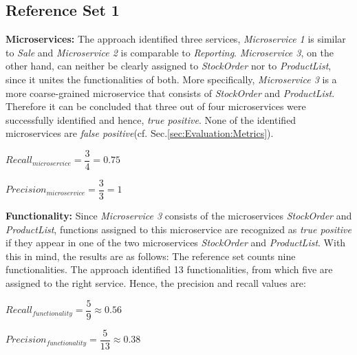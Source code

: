 \subsection{Reference Set 1}

\textbf{Microservices:} The approach identified three services, \textit{Microservice 1} is similar to \textit{Sale} and \textit{Microservice 2} is comparable to \textit{Reporting}. \textit{Microservice 3}, on the other hand, can neither be clearly assigned to \textit{StockOrder} nor to \textit{ProductList}, since it unites the functionalities of both. More specifically, \textit{Microservice 3} is a more coarse-grained microservice that consists of \textit{StockOrder} and \textit{ProductList}. Therefore it can be concluded that three out of four microservices were successfully identified and hence, \textit{true positive}. None of the identified microservices are \textit{false positive}(cf. Sec.\ref{sec:Evaluation:Metrics}).

\hspace{1cm}
\noindent
\begin{minipage}{.4\linewidth}
		\vspace{0.5cm}
	\flushleft

		
	$Recall_{microservice}=\dfrac{3}{4} = 0.75  $
		\vspace{0.5cm}
	
\end{minipage}%
\begin{minipage}{.5\linewidth}
	\vspace{0.5cm}
	\flushleft

		
	$Precision_{microservice}=\dfrac{3}{3} = 1  $
		\vspace{0.5cm}
	
\end{minipage}

\noindent
\textbf{Functionality:} Since \textit{Microservice 3} consists of the microservices \textit{StockOrder} and \textit{ProductList}, functions assigned to this microservice are recognized as \textit{true positive } if they appear in one of the two microservices \textit{StockOrder} and \textit{ProductList}.
With this in mind, the results are as follows: The reference set counts nine functionalities. The approach identified 13 functionalities, from which five are assigned to the right service. Hence, the precision and recall values are:

\hspace{1cm}
\noindent
\begin{minipage}{.4\linewidth}
	\vspace{0.5cm}
	\flushleft
	
	
	$Recall_{functionality}=\dfrac{5}{9} \approx 0.56  $
	\vspace{0.5cm}
	
\end{minipage}%
\begin{minipage}{.5\linewidth}
	\vspace{0.5cm}
	\flushleft
	
	
	$Precision_{functionality}=\dfrac{5}{13} \approx 0.38  $
	\vspace{0.5cm}
	
\end{minipage}



